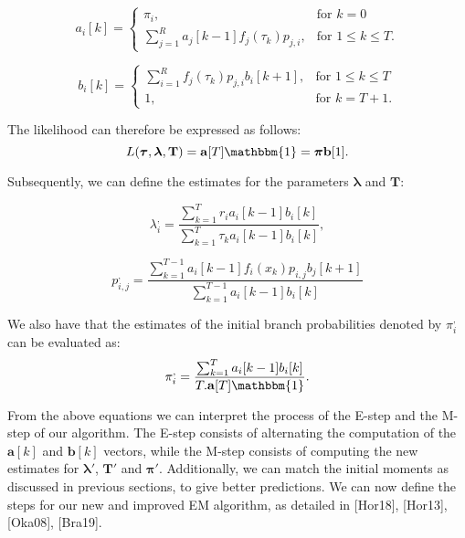 \documentclass[a4paper,11pt,titlepage]{article}
\begin{document}
\begin{equation}
    a_i[k] = \begin{cases}
    \pi_i, & \text{for } k = 0 \\
    \sum_{j=1}^R a_j[k-1]f_j(\tau_k)p_{j,i}, & \text{for } 1 \leq k \leq T.
  \end{cases}
\end{equation}

\begin{equation}
b_i[k] = \begin{cases}
    \sum_{i=1}^R f_j(\tau_k)p_{j,i} b_i[k+1], & \text{for } 1 \leq k \leq T \\
    1, & \text{for } k = T+1.
  \end{cases}
\end{equation}

The likelihood can therefore be expressed as follows: 
\begin{equation}
    L(\bm{\tau}, \bm{\lambda}, \mathbf{T}) = \mathbf{a}[T] \mathbbm{1} = \bm{\pi} \mathbf{b}[1].
\end{equation}

Subsequently, we can define the estimates for the parameters $\bm{\lambda}$ and $\mathbf{T}$:

\begin{equation}
    \lambda_i^{,} = \frac{\sum_{k=1}^T r_i a_i[k-1]b_i[k]}{\sum_{k=1}^T \tau_k a_i[k-1]b_i[k]},
\end{equation}

\begin{equation}
    p_{i,j}^{,} = \frac{\sum_{k=1}^{T-1} a_i[k-1] f_i(x_k) p_{i,j} b_j[k+1]}{\sum_{k=1}^{T-1} a_i[k-1] b_i[k]}
\end{equation}

We also have that the estimates of the initial branch probabilities denoted by $\pi_i^{,}$ can be evaluated as: 
\begin{equation}
    \pi_i^{,} = \frac{\sum_{k=1}^T a_i[k-1]b_i[k]}{T.\mathbf{a}[T] \mathbbm{1}}.
\end{equation}

From the above equations we can interpret the process of the E-step and the M-step of our algorithm. The E-step consists of alternating the computation of the $\mathbf{a}[k]$ and $\mathbf{b}[k]$ vectors, while the M-step consists of computing the new estimates for $\bm{\lambda}'$, $\mathbf{T}'$ and $\bm{\pi}'$. Additionally, we can match the initial moments as discussed in previous sections, to give better predictions. We can now define the steps for our new and improved EM algorithm, as detailed in [Hor18], [Hor13], [Oka08], [Bra19]. \\
\end{document}
